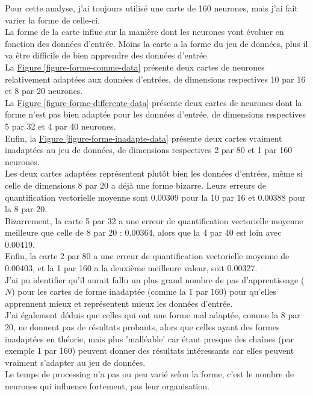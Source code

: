 \documentclass{article}
\begin{document}
Pour cette analyse, j'ai toujours utilisé une carte de 160 neurones, mais j'ai fait varier la forme de celle-ci.\\
La forme de la carte influe sur la manière dont les neurones vont évoluer en fonction des données d'entrée. Moins la carte a la forme du jeu de données, plus il va être difficile de bien apprendre des données d'entrée.\\
La \hyperlink{figure-forme-comme-data}{Figure \ref{figure-forme-comme-data}} présente deux cartes de neurones relativement adaptées aux données d'entrées, de dimensions respectives 10 par 16 et 8 par 20 neurones.\\
La \hyperlink{figure-forme-differente-data}{Figure \ref{figure-forme-differente-data}} présente deux cartes de neurones dont la forme n'est pas bien adaptée pour les données d'entrée, de dimensions respectives 5 par 32 et 4 par 40 neurones.\\
Enfin, la \hyperlink{figure-forme-inadapte-data}{Figure \ref{figure-forme-inadapte-data}} présente deux cartes vraiment inadaptées au jeu de données, de dimensions respectives 2 par 80 et 1 par 160 neurones.\\
Les deux cartes adaptées représentent plutôt bien les données d'entrées, même si celle de dimensions 8 par 20 a déjà une forme bizarre. Leurs erreurs de quantification vectorielle moyenne sont 0.00309 pour la 10 par 16 et 0.00388 pour la 8 par 20.\\
Bizarrement, la carte 5 par 32 a une erreur de quantification vectorielle moyenne meilleure que celle de 8 par 20 : 0.00364, alors que la 4 par 40 est loin avec 0.00419.\\
Enfin, la carte 2 par 80 a une erreur de quantification vectorielle moyenne de 0.00403, et la 1 par 160 a la deuxième meilleure valeur, soit 0.00327.\\
J'ai pu identifier qu'il aurait fallu un plus grand nombre de pas d'apprentissage ($N$) pour les cartes de forme inadaptée (comme la 1 par 160) pour qu'elles apprennent mieux et représentent mieux les données d'entrée.\\
J'ai également déduis que celles qui ont une forme mal adaptée, comme la 8 par 20, ne donnent pas de résultats probants, alors que celles ayant des formes inadaptées en théorie, mais plus 'malléable' car étant presque des chaînes (par exemple 1 par 160) peuvent donner des résultats intéressants car elles peuvent vraiment s'adapter au jeu de données.\\
Le temps de processing n'a pas ou peu varié selon la forme, c'est le nombre de neurones qui influence fortement, pas leur organisation.
\end{document}
